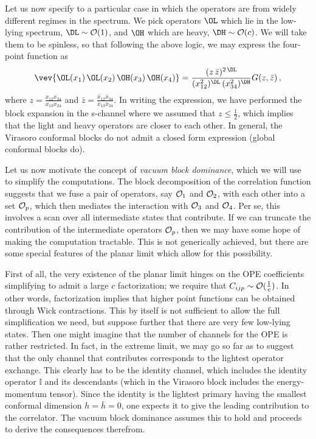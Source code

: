 \documentclass[12pt,openany]{book}
\begin{document}
Let us now specify to a particular case in which the operators are from widely different regimes in the spectrum. We pick operators
$\OL$  which lie in the low-lying spectrum, $\DL \sim {\cal O}(1)$, and $\OH$ which are heavy, $\DH \sim {\cal O}(c)$. We will take them to be spinless, so that following the above logic, we may express the four-point function as
\begin{equation}
\vev{\OL(x_1)\, \OL(x_2)\,\OH(x_3)\,\OH(x_4)} = \frac{(z\,{\bar z})^{2\,\DL}}{(x_{12}^2)^{\DL}\, (x_{34}^2)^{\DH}}  G(z,\bar{z})\,,
\label{eq:fpex}
\end{equation}
%
where $z = \frac{x_{12} x_{34}}{x_{13} x_{24}}$ and $\bar{z} = \frac{\bar{x}_{12} \bar{x}_{34}}{\bar{x}_{13} \bar{x}_{34}} $.
In writing the expression, we have performed the block expansion in the s-channel where we assumed that $z \leq \frac{1}{2}$, which implies that the light and heavy operators are closer to each other. In general, the Virasoro conformal blocks do not admit a closed form expression (global conformal blocks do).

Let us now motivate the concept of \emph{vacuum block dominance}, which we will use to simplify the computations. The block decomposition of the correlation function suggests that we fuse a pair of operators, say ${\cal O}_1$ and ${\cal O}_2$, with each other into a set ${\cal O}_p$, which then mediates the interaction with ${\cal O}_3$ and ${\cal O}_4$. Per se, this involves a scan over all intermediate states that contribute.  If we can truncate the contribution of the intermediate operators ${\cal O}_p$, then we may have some hope of making the computation tractable. This is not generically achieved, but there are some special features of the planar limit which allow for this possibility.

First of all, the very existence of the planar limit hinges on  the OPE coefficients simplifying to admit a large $c$ factorization; we require that $C_{ijp} \sim {\cal O}(\frac{1}{c})$. In other words, factorization implies that higher point functions can be obtained through Wick contractions.  This by itself is not sufficient to allow the full simplification we need, but suppose further that there are very few low-lying states. Then one might imagine that the number of channels for the OPE is rather restricted. In fact, in the extreme limit, we may go so far as to suggest that the only channel that contributes corresponds to the lightest operator exchange.
 This clearly has to be the  identity channel, which includes the identity operator $\mathbb{I}$ and its descendants (which in the Virasoro block includes the energy-momentum tensor). Since the identity is the lightest primary having the  smallest conformal dimension $h=\bar{h} =0$,  one expects it to give the leading contribution to the correlator. The vacuum block dominance assumes this to hold and proceeds to derive the consequences therefrom.
\end{document}
